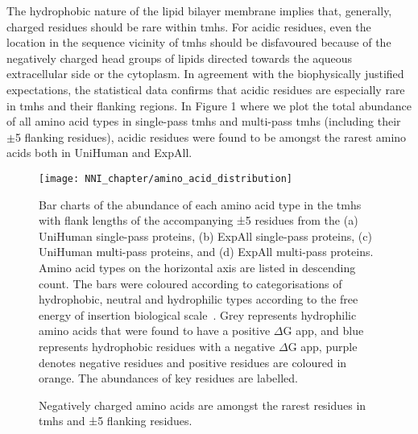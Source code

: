 The hydrophobic nature of the lipid bilayer membrane implies that, generally, charged residues should be rare within \gls{tmh}s. For acidic residues, even the location in the sequence vicinity of \gls{tmh}s should be disfavoured because of the negatively charged head groups of lipids directed towards the aqueous extracellular side or the cytoplasm. In agreement with the biophysically justified expectations, the statistical data confirms that acidic residues are especially rare in \gls{tmh}s and their flanking regions. In Figure 1 where we plot the total abundance of all amino acid types in single-pass \gls{tmh}s and multi-pass \gls{tmh}s (including their $\pm$5 flanking residues), acidic residues were found to be amongst the rarest amino acids both in UniHuman and ExpAll.

\begin{figure}[!ht]
\centering
\texttt{[image: NNI\_chapter/amino\_acid\_distribution]}
\caption{ Negatively charged amino acids are amongst the rarest residues in \gls{tmh}s and ±5 flanking residues.}

\medskip
\small
\justify
Bar charts of the abundance of each amino acid type in the \gls{tmh}s with flank lengths of the accompanying ±5 residues from the (a) UniHuman single-pass proteins, (b) ExpAll single-pass proteins, (c) UniHuman multi-pass proteins, and (d) ExpAll multi-pass proteins. Amino acid types on the horizontal axis are listed in descending count. The bars were coloured according to categorisations of hydrophobic, neutral and hydrophilic types according to the free energy of insertion biological scale~\cite{Hessa2005}. Grey represents hydrophilic amino acids that were found to have a positive $\Delta$G app, and blue represents hydrophobic residues with a negative $\Delta$G app, purple denotes negative residues and positive residues are coloured in orange. The abundances of key residues are labelled.
\label{fig:amino_acid_distribution}
\end{figure}

